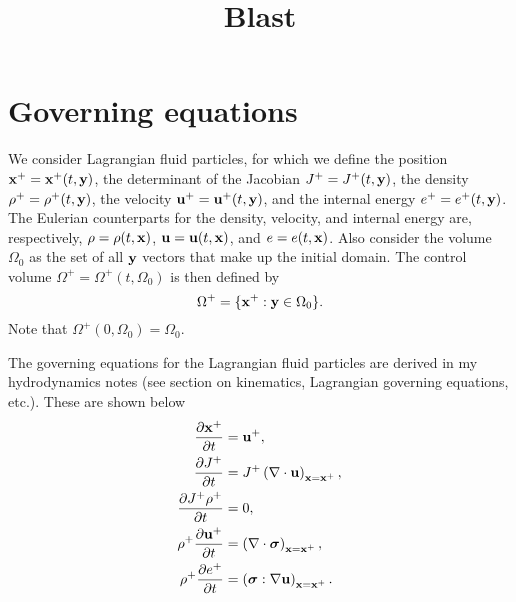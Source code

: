 \documentclass[11pt]{article}
\title{Blast}
\begin{document}
\maketitle

\section{Governing equations}
We consider Lagrangian fluid particles, for which we define the position $\mathbf{x}^+=\mathbf{x}^+(t,\mathbf{y})$, the determinant of the Jacobian $J^+ = J^+(t,\mathbf{y})$, the density $\rho^+ = \rho^+(t,\mathbf{y})$, the velocity $\mathbf{u}^+ = \mathbf{u}^+(t,\mathbf{y})$, and the internal energy $e^+ = e^+(t,\mathbf{y})$. The Eulerian counterparts for the density, velocity, and internal energy are, respectively, $\rho = \rho(t,\mathbf{x})$, $\mathbf{u} = \mathbf{u}(t,\mathbf{x})$, and $e = e(t,\mathbf{x})$. Also consider the volume $\Omega_0$ as the set of all $\mathbf{y}$ vectors that make up the initial domain. The control volume $\Omega^+ = \Omega^+(t, \Omega_0)$ is then defined by
\begin{equation}
    \Omega^+ = \{ \mathbf{x}^+:\mathbf{y} \in \Omega_0 \}.
\end{equation}
Note that $\Omega^+(0,\Omega_0) = \Omega_0$.

The governing equations for the Lagrangian fluid particles are derived in my hydrodynamics notes (see section on kinematics, Lagrangian governing equations, etc.). These are shown below
\begin{align}
    \frac{\partial \mathbf{x}^+}{\partial t} &= \mathbf{u}^+, \label{eq:evol_x} \\
    \frac{\partial J^+}{\partial t} &= J^+ \left ( \nabla \cdot \mathbf{u} \right )_{\mathbf{x} = \mathbf{x}^+}, \label{eq:evol_J} \\
    \frac{\partial J^+ \rho^+}{\partial t} &= 0, \label{eq:evol_rho} \\
    \rho^+ \frac{\partial \mathbf{u}^+}{\partial t} &= \left ( \nabla \cdot \bm \sigma \right )_{\mathbf{x} = \mathbf{x}^+}, \label{eq:evol_u} \\
    \rho^+ \frac{\partial e^+}{\partial t} &= \left ( \bm \sigma : \nabla \mathbf{u} \right )_{\mathbf{x} = \mathbf{x}^+}. \label{eq:evol_e}
\end{align}
\end{document}
